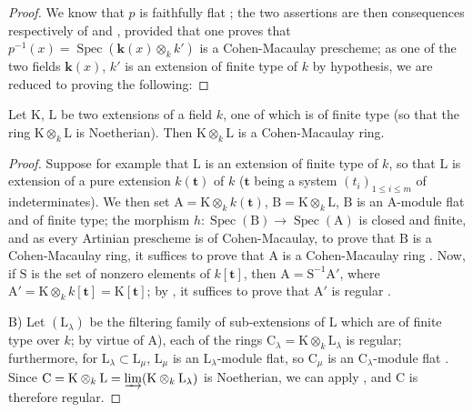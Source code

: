 \begin{proof}
We know that $p$ is faithfully flat ; the two assertions are then consequences respectively of  and , provided that one proves that $p^{-1}(x)=\operatorname{Spec}(\boldsymbol{k}(x)\otimes_k k')$ is a Cohen-Macaulay prescheme; as one of the two fields $\boldsymbol{k}(x)$, $k'$ is an extension of finite type of $k$ by hypothesis, we are reduced to proving the following:
\end{proof}

\begin{lemma}[6.7.1.1]
\label{IV.6.7.1.1}
Let $\mathrm{K}$, $\mathrm{L}$ be two extensions of a field $k$, one of which is of finite type (so that the ring $\mathrm{K}\otimes_k\mathrm{L}$ is Noetherian). Then $\mathrm{K}\otimes_k\mathrm{L}$ is a Cohen-Macaulay ring.
\end{lemma}

\begin{proof}
Suppose for example that $\mathrm{L}$ is an extension of finite type of $k$, so that $\mathrm{L}$ is extension of a pure extension $k(\mathbf{t})$ of $k$ ($\mathbf{t}$ being a system $(t_i)_{1\leqslant i\leqslant m}$ of indeterminates). We then set $\mathrm{A}=\mathrm{K}\otimes_k k(\mathbf{t})$, $\mathrm{B}=\mathrm{K}\otimes_k\mathrm{L}$, $\mathrm{B}$ is an $\mathrm{A}$-module flat  and of finite type; the morphism $h:\operatorname{Spec}(\mathrm{B})\to\operatorname{Spec}(\mathrm{A})$ is closed and finite, and as every Artinian prescheme is of Cohen-Macaulay, to prove that $\mathrm{B}$ is a Cohen-Macaulay ring, it suffices to prove that $\mathrm{A}$ is a Cohen-Macaulay ring . Now, if $\mathrm{S}$ is the set of nonzero elements of $k[\mathbf{t}]$, then $\mathrm{A}=\mathrm{S}^{-1}\mathrm{A}'$, where $\mathrm{A}'=\mathrm{K}\otimes_k k[\mathbf{t}]=\mathrm{K}[\mathbf{t}]$; by , it suffices to prove that $\mathrm{A}'$ is regular .


B) Let $(\mathrm{L}_\lambda)$ be the filtering family of sub-extensions of $\mathrm{L}$ which are of finite type over $k$; by virtue of A), each of the rings $\mathrm{C}_\lambda=\mathrm{K}\otimes_k\mathrm{L}_\lambda$ is regular; furthermore, for $\mathrm{L}_\lambda\subset\mathrm{L}_\mu$, $\mathrm{L}_\mu$ is an $\mathrm{L}_\lambda$-module flat, so $\mathrm{C}_\mu$ is an $\mathrm{C}_\lambda$-module flat . Since $\mathrm{C}=\mathrm{K}\otimes_k\mathrm{L}=\varinjlim(\mathrm{K}\otimes_k\mathrm{L}_\lambda)$ is Noetherian, we can apply , and $\mathrm{C}$ is therefore regular.
\end{proof}

